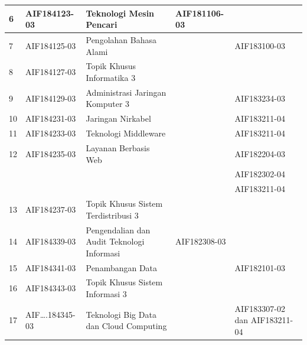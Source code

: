 \begin{table}[H]
\begin{tabular}{|p{0.5cm}|p{2.85cm}|p{4.95cm}|p{2.7cm}|p{2.7cm}|}
6 & AIF184123-03 & Teknologi Mesin Pencari & AIF181106-03 &  \\ \hline
7 & AIF184125-03 & Pengolahan Bahasa Alami &  & AIF183100-03 \\ \hline
8 & AIF184127-03 & Topik Khusus Informatika 3 &  &  \\ \hline
9 & AIF184129-03 & Administrasi Jaringan Komputer 3 &  & AIF183234-03 \\ \hline
10 & AIF184231-03 & Jaringan Nirkabel &  & AIF183211-04 \\ \hline
11 & AIF184233-03 & Teknologi Middleware &  & AIF183211-04 \\ \hline
12 & AIF184235-03 & Layanan Berbasis Web &  & AIF182204-03 \\
 &  &  &  & AIF182302-04 \\
 &  &  &  & AIF183211-04 \\ \hline
13 & AIF184237-03 & Topik Khusus Sistem Terdistribusi 3 &  &  \\ \hline
14 & AIF184339-03 & Pengendalian dan Audit Teknologi Informasi & AIF182308-03 &  \\ \hline
15 & AIF184341-03 & Penambangan Data &  & AIF182101-03 \\ \hline
16 & AIF184343-03 & Topik Khusus Sistem Informasi 3 &  &  \\ \hline
17 & AIF….184345-03 & Teknologi Big Data dan Cloud Computing &  & AIF183307-02 dan AIF183211-04 \\ \hline
		\end{tabular}
	\label{tab:DaftarMataKuliahWajibDanPrasyaratnya2}
\end{table}

